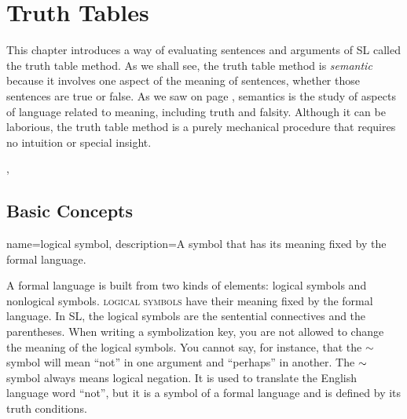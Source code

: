 \chapter{Truth Tables}
\label{chap:truth_tables}


This chapter introduces a way of evaluating sentences and arguments of SL called the truth table method. As we shall see, the truth table method is \emph{semantic} because it involves one aspect of the meaning of sentences, whether those sentences are true or false. As we saw on page \pageref{def:semantics}, semantics is the study of aspects of language related to meaning, including truth and falsity. Although it can be laborious, the truth table method is a purely mechanical procedure that requires no intuition or special insight. 



, \label{ver_var}\nix{} 


\section{Basic Concepts}


{
name=logical symbol,
description={A symbol that has its meaning fixed by the formal language.}
}

A formal language is built from two kinds of elements: logical symbols and nonlogical symbols. \textsc{\Glspl{logical symbol}} \label{def:logical_symbol} have their meaning fixed by the formal language. In SL, the logical symbols are the sentential connectives and the parentheses. When writing a symbolization key, you are not allowed to change the meaning of the logical symbols. You cannot say, for instance, that the $\mathord{\sim}$ symbol will mean ``not'' in one argument and ``perhaps'' in another. The $\mathord{\sim}$ symbol always means logical negation. It is used to translate the English language word ``not'', but it is a symbol of a formal language and is defined by its truth conditions.

